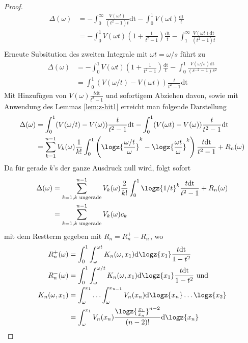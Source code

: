 \begin{satz}
\begin{proof}
\begin{align}
	\Delta(\omega) &= -\int_0^{\infty} \frac{V(\omega t)}{(t^2-1)t} \mathrm{dt} - \int_0^{1} V(\omega t) \frac{\mathrm{dt}}{t}\\
	&=-\int_0^1 V(\omega t) (1 + \frac{1}{t^2-1}) \frac{\mathrm{dt}}{t} - \int_{1}^{\infty} \frac{V(\omega t)\mathrm{dt}}{(t^2-1) t}\\
\end{align}
Erneute Subsitution des zweiten Integrale mit $\omega t = \omega / s$ führt zu 
\begin{align}
	\Delta(\omega) &=-\int_0^1 V(\omega t) (1 + \frac{1}{t^2-1}) \frac{\mathrm{dt}}{t} - \int_{0}^{1} \frac{V(\omega/s)\mathrm{dt}}{(s^{-2}-1) s^2}\\
	&=\int_0^1 ( V(\omega/t)- V(\omega t)) \frac{t}{t^2-1} \mathrm{dt}
\end{align}
Mit Hinzufügen von $V(\omega) \frac{t \mathrm{dt}}{t^2-1}$ und sofortigem Abziehen davon, sowie mit Anwendung des Lemmas \ref{lem:z-hit1} erreicht man folgende Darstellung
\begin{align}
	\Delta(\omega) &=  \int_0^1 (V(\omega/t) - V(\omega)) \frac{t}{t^2-1} \mathrm{dt} - \int_0^1 (V(\omega t) - V(\omega)) \frac{t}{t^2-1} \mathrm{dt}\\
	&= \sum_{k=1}^{n-1} V_k(\omega) \frac{1}{k!} \int_0^1 \left(\logz{\frac{\omega/t}{\omega}}^k - \logz{\frac{\omega t}{\omega}}^k \right)\frac{t \mathrm{dt}}{t^2-1} + R_n({\omega})
\end{align} 
	Da für gerade $k$'s der ganze Ausdruck null wird, folgt sofort
	\begin{align}
		\Delta(\omega) &=\sum_{k=1, k \text{ ungerade}}^{n-1} V_k(\omega) \frac{2}{k!} \int_0^1 \logz{1/t}^k \frac{t \mathrm{dt}}{t^2-1} + R_n({\omega})\\
		&=\sum_{k=1, k \text{ ungerade}}^{n-1} V_k(\omega) c_k
	\end{align}
	mit dem Restterm gegeben mit $R_n = R^+_n - R^-_n$, wo
	\begin{align}
		R^+_n(\omega) &= \int_0^1 \int_{\omega}^{\omega t} K_n(\omega, x_1) \mathrm{d} \logz{x_1} \frac{t\mathrm{dt}}{1-t^2}\\
		R^-_n(\omega) &= \int_0^1 \int_{\omega}^{\omega/ t} K_n(\omega, x_1) \mathrm{d} \logz{x_1} \frac{t\mathrm{dt}}{1-t^2} \text{ und }\\
		K_n(\omega, x_1) &= \int_{\omega}^{x_1} \hdots \int_{\omega}^{x_{n-1}} V_n(x_n) \mathrm{d} \logz{x_n} \hdots \logz{x_2}\label{gl:Kn:large1}\\
						 &= \int_{\omega}^{x_1} V_n(x_n) \frac{\logz{\frac{x_1}{x_n}}^{n-2}}{(n-2)!} \mathrm{d} \logz{x_n}\label{gl:Kn:kompakt1}

\end{align}
\end{proof}
\end{satz}
